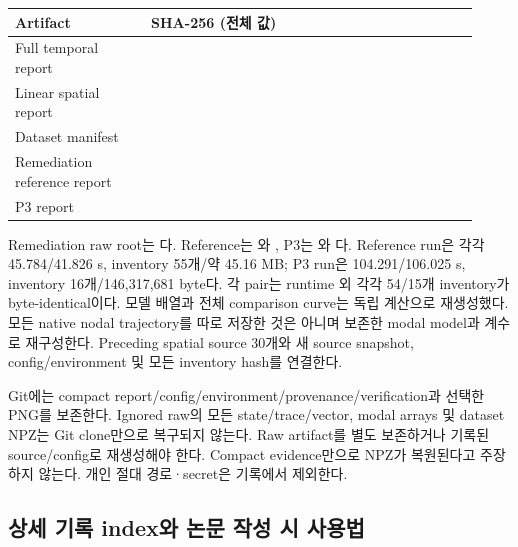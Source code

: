 \documentclass[10pt]{article}
\begin{document}
\begin{longtable}{L{0.27\linewidth}L{0.65\linewidth}}
\toprule Artifact & SHA-256 (전체 값)\\\midrule
Full temporal report & \\
Linear spatial report & \\
Dataset manifest & \\
Remediation reference report & \\
P3 report & \\
\bottomrule\end{longtable}

Remediation raw root는 다.
Reference는 와 ,
P3는 와 다.
Reference run은 각각 45.784/41.826 s, inventory 55개/약 45.16 MB;
P3 run은 104.291/106.025 s, inventory 16개/146,317,681 byte다.
각 pair는 runtime 외 각각 54/15개 inventory가 byte-identical이다.
모델 배열과 전체 comparison curve는 독립 계산으로 재생성했다.
모든 native nodal trajectory를 따로 저장한 것은 아니며 보존한 modal model과 계수로 재구성한다.
Preceding spatial source 30개와 새 source snapshot, config/environment 및 모든 inventory hash를 연결한다.

Git에는 compact report/config/environment/provenance/verification과 선택한 PNG를 보존한다.
Ignored raw의 모든 state/trace/vector, modal arrays 및 dataset NPZ는 Git clone만으로 복구되지 않는다.
Raw artifact를 별도 보존하거나 기록된 source/config로 재생성해야 한다. Compact evidence만으로
NPZ가 복원된다고 주장하지 않는다. 개인 절대 경로·secret은 기록에서 제외한다.

\subsection{상세 기록 index와 논문 작성 시 사용법}
\end{document}

